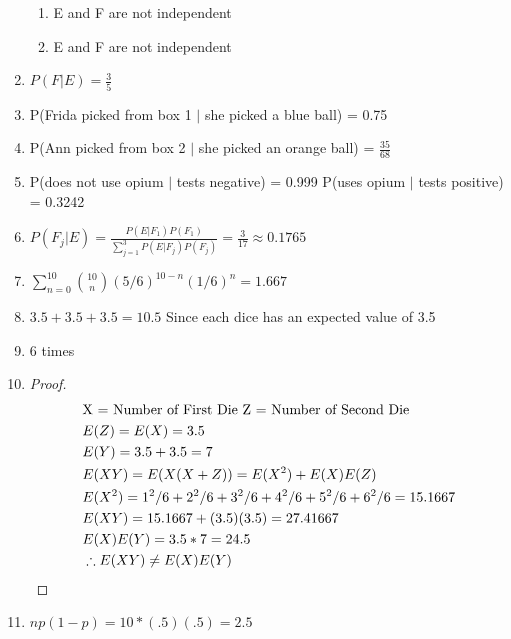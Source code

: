 \documentclass[11pt]{article}
\begin{document}
\begin{enumerate}
\begin{enumerate}
        \item E and F are not independent
        \item E and F are not independent
    \end{enumerate}
    \item $P(F|E) = \frac{3}{5}$
    \item P(Frida picked from box 1 $|$ she picked a blue ball) = 0.75
    \item P(Ann picked from box 2 $|$ she picked an orange ball) = $\frac{35}{68}$
    \item P(does not use opium $|$ tests negative) = 0.999 \newline P(uses opium $|$ tests positive) = 0.3242
    \item $P(F_j | E) = \frac{P(E|F_1)P(F_1)}{\sum_{j = 1}^{3}P(E|F_j)P(F_j)} = \frac{3}{17} \approx 0.1765$
    \item $\sum_{n=0}^{10} \binom{10}{n}(5/6)^{10-n}(1/6)^n = 1.667$
    \item $ 3.5 + 3.5 + 3.5 = 10.5 $ Since each dice has an expected value of 3.5
    \item 6 times
    \item \begin{proof}
        \begin{align*}
            & \text{X = Number of First Die Z = Number of Second Die} \\
            & E(Z) = E(X) = 3.5 \\
            & E(Y) = 3.5 + 3.5 = 7 \\
            & E(XY) = E(X(X+Z)) = E(X^2) + E(X)E(Z) \\
            & E(X^2) = 1^2/6 + 2^2/6 + 3^2/6 + 4^2/6 + 5^2/6 + 6^2/6 = 15.1667 \\
            & E(XY) = 15.1667 + (3.5)(3.5) = 27.41667 \\
            & E(X)E(Y) = 3.5 * 7 = 24.5 \\
            & \therefore E(XY) \neq E(X)E(Y) \qedhere
        \end{align*}
    \end{proof}
    \item $np(1-p) = 10*(.5)(.5) = 2.5 $
\end{enumerate}
\end{document}
